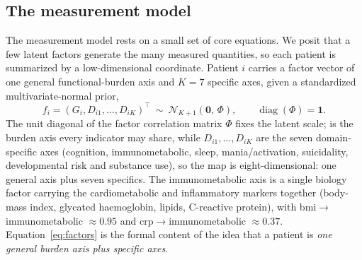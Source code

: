 \subsection{The measurement model}

The measurement model rests on a small set of core equations. We posit that a few latent factors generate the many
measured quantities, so each patient is summarized by a low-dimensional coordinate.
Patient $i$ carries a factor vector of one general functional-burden axis \Gfac{} and
$K=7$ specific axes, given a standardized multivariate-normal prior,
\begin{equation}
  f_i=(G_i,D_{i1},\dots,D_{iK})^{\top}\ \sim\ \mathcal{N}_{K+1}\!\left(\mathbf 0,\,\Phi\right),
  \qquad \operatorname{diag}(\Phi)=\mathbf 1 .
  \label{eq:factors}
\end{equation}
The unit diagonal of the factor correlation matrix $\Phi$ fixes the latent scale;
\Gfac{} is the burden axis every indicator may share, while $D_{i1},\dots,D_{iK}$ are the
seven domain-specific axes (cognition, immunometabolic, sleep, mania/activation,
suicidality, developmental risk and substance use), so the map is eight-dimensional:
one general axis plus seven specifics. The immunometabolic axis is a single biology
factor carrying the cardiometabolic and inflammatory markers together (body-mass index,
glycated haemoglobin, lipids, C-reactive protein), with bmi$\to$immunometabolic $\approx
0.95$ and crp$\to$immunometabolic $\approx 0.37$. Equation~\eqref{eq:factors} is the
formal content of the idea that a patient is \emph{one general burden axis plus specific
axes}.

